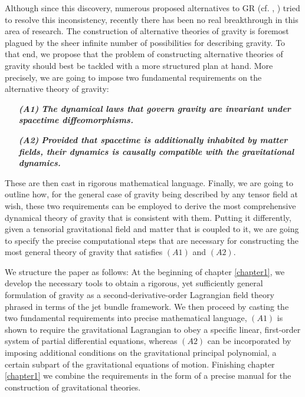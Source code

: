 \documentclass[%
 reprint,
nofootinbib,
 amsmath,amssymb,
 aps,
 prd,
floatfix,
]{revtex4-2}
\begin{document}
Although since this discovery, numerous proposed alternatives to GR (cf. \cite{2013LRR....16....9Y}, \cite{fR2}) tried to resolve this inconsistency, recently there has been no real breakthrough in this area of research. The construction of alternative theories of gravity is foremost plagued by the sheer infinite number of possibilities for describing gravity. To that end, we propose that the problem of constructing alternative theories of gravity should best be tackled with a more structured plan at hand.
More precisely, we are going to impose two fundamental requirements on the alternative theory of gravity: 
\begin{itemize}
    \item[\textbf{\textit{(A1)}}] \textbf{\textit{The dynamical laws that govern gravity are invariant under spacetime diffeomorphisms.}}
    \item[\textbf{\textit{(A2)}}] \textbf{\textit{Provided that spacetime is additionally inhabited by matter fields, their dynamics is causally compatible with the gravitational dynamics.}}
\end{itemize}
These are then cast in rigorous mathematical language.
Finally, we are going to outline how, for the general case of gravity being described by any tensor field at wish, these two requirements can be employed to derive the most comprehensive dynamical theory of gravity that is consistent with them.
Putting it differently, given a tensorial gravitational field and matter that is coupled to it, we are going to specify the precise computational steps that are necessary for constructing the most general theory of gravity that satisfies $(A1)$ and $(A2)$.

We structure the paper as follows: 
At the beginning of chapter \ref{chapter1}, we develop the necessary tools to obtain a rigorous, yet sufficiently general formulation of gravity as a second-derivative-order Lagrangian field theory phrased in terms of the jet bundle framework. We then proceed by casting the two fundamental requirements into precise mathematical language, $(A1)$ is shown to require the gravitational Lagrangian to obey a specific linear, first-order system of partial differential equations, whereas $(A2)$ can be incorporated by imposing additional conditions on the gravitational principal polynomial, a certain subpart of the gravitational equations of motion. Finishing chapter \ref{chapter1} we combine the requirements in the form of a precise manual for the construction of gravitational theories.
\end{document}
